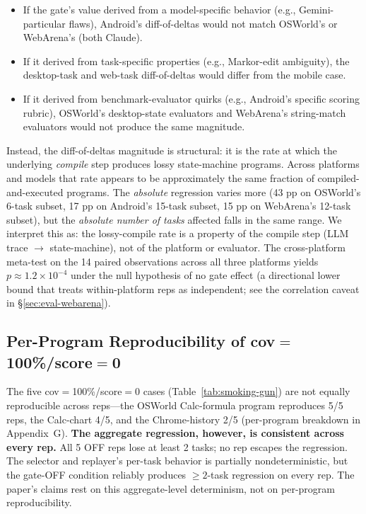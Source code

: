 \documentclass[11pt]{article}
\begin{document}
\begin{itemize}[leftmargin=2em]\tightlist
\item If the gate's value derived from a model-specific behavior (e.g., Gemini-particular flaws), Android's diff-of-deltas would not match OSWorld's or WebArena's (both Claude).
\item If it derived from task-specific properties (e.g., Markor-edit ambiguity), the desktop-task and web-task diff-of-deltas would differ from the mobile case.
\item If it derived from benchmark-evaluator quirks (e.g., Android's specific scoring rubric), OSWorld's desktop-state evaluators and WebArena's string-match evaluators would not produce the same magnitude.
\end{itemize}

Instead, the diff-of-deltas magnitude is structural: it is the rate at which the underlying \emph{compile} step produces lossy state-machine programs. Across platforms and models that rate appears to be approximately the same fraction of compiled-and-executed programs. The \emph{absolute} regression varies more (43 pp on OSWorld's 6-task subset, 17 pp on Android's 15-task subset, 15 pp on WebArena's 12-task subset), but the \emph{absolute number of tasks} affected falls in the same range. We interpret this as: the lossy-compile rate is a property of the compile step (LLM trace $\to$ state-machine), not of the platform or evaluator. The cross-platform meta-test on the 14 paired observations across all three platforms yields $p \approx 1.2 \times 10^{-4}$ under the null hypothesis of no gate effect (a directional lower bound that treats within-platform reps as independent; see the correlation caveat in \S\ref{sec:eval-webarena}).

\subsection{Per-Program Reproducibility of cov$=$100\%/score$=$0}

The five cov$=$100\%/score$=$0 cases (Table~\ref{tab:smoking-gun}) are not equally reproducible across reps---the OSWorld Calc-formula program reproduces 5/5 reps, the Calc-chart 4/5, and the Chrome-history 2/5 (per-program breakdown in Appendix~G). \textbf{The aggregate regression, however, is consistent across every rep.} All 5 OFF reps lose at least 2 tasks; no rep escapes the regression. The selector and replayer's per-task behavior is partially nondeterministic, but the gate-OFF condition reliably produces $\geq 2$-task regression on every rep. The paper's claims rest on this aggregate-level determinism, not on per-program reproducibility.
\end{document}
